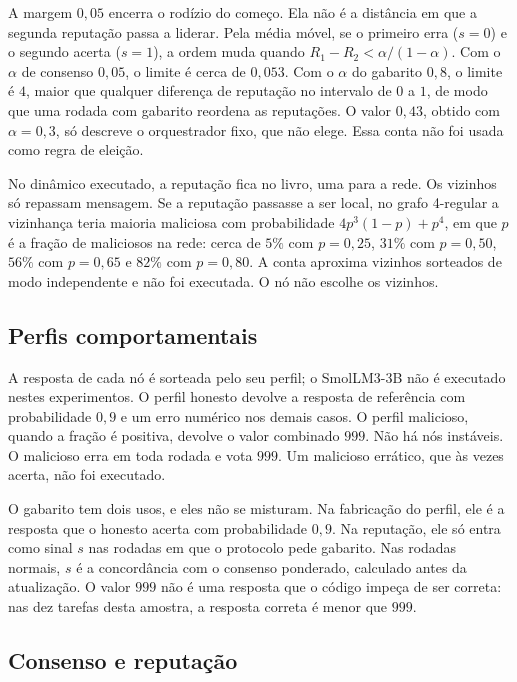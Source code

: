 \documentclass[12pt]{article}
\begin{document}
A margem $0{,}05$ encerra o rodízio do começo. Ela não é a distância em que a segunda reputação passa a liderar. Pela média móvel, se o primeiro erra ($s=0$) e o segundo acerta ($s=1$), a ordem muda quando $R_1 - R_2 < \alpha/(1-\alpha)$. Com o $\alpha$ de consenso $0{,}05$, o limite é cerca de $0{,}053$. Com o $\alpha$ do gabarito $0{,}8$, o limite é $4$, maior que qualquer diferença de reputação no intervalo de $0$ a $1$, de modo que uma rodada com gabarito reordena as reputações. O valor $0{,}43$, obtido com $\alpha = 0{,}3$, só descreve o orquestrador fixo, que não elege. Essa conta não foi usada como regra de eleição.

No dinâmico executado, a reputação fica no livro, uma para a rede. Os vizinhos só repassam mensagem. Se a reputação passasse a ser local, no grafo 4-regular a vizinhança teria maioria maliciosa com probabilidade $4p^{3}(1-p)+p^{4}$, em que $p$ é a fração de maliciosos na rede: cerca de $5\%$ com $p=0{,}25$, $31\%$ com $p=0{,}50$, $56\%$ com $p=0{,}65$ e $82\%$ com $p=0{,}80$. A conta aproxima vizinhos sorteados de modo independente e não foi executada. O nó não escolhe os vizinhos.

\subsection{Perfis comportamentais}

A resposta de cada nó é sorteada pelo seu perfil; o SmolLM3-3B não é executado nestes experimentos. O perfil honesto devolve a resposta de referência com probabilidade $0{,}9$ e um erro numérico nos demais casos. O perfil malicioso, quando a fração é positiva, devolve o valor combinado $999$. Não há nós instáveis. O malicioso erra em toda rodada e vota $999$. Um malicioso errático, que às vezes acerta, não foi executado.

O gabarito tem dois usos, e eles não se misturam. Na fabricação do perfil, ele é a resposta que o honesto acerta com probabilidade $0{,}9$. Na reputação, ele só entra como sinal $s$ nas rodadas em que o protocolo pede gabarito. Nas rodadas normais, $s$ é a concordância com o consenso ponderado, calculado antes da atualização. O valor $999$ não é uma resposta que o código impeça de ser correta: nas dez tarefas desta amostra, a resposta correta é menor que $999$.

\subsection{Consenso e reputação}
\end{document}
